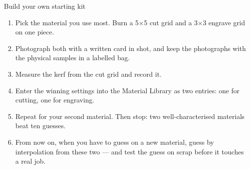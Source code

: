 \begin{tryit}{Build your own starting kit}
\begin{enumerate}[label=\arabic*.,leftmargin=1.4em]
  \item Pick the material you use most. Burn a 5$\times$5 cut grid and a
        3$\times$3 engrave grid on one piece.
  \item Photograph both with a written card in shot, and keep the photographs
        with the physical samples in a labelled bag.
  \item Measure the kerf from the cut grid and record it.
  \item Enter the winning settings into the Material Library as two entries: one
        for cutting, one for engraving.
  \item Repeat for your second material. Then stop: two well-characterised
        materials beat ten guesses.
  \item From now on, when you have to guess on a new material, guess by
        interpolation from these two --- and test the guess on scrap before it
        touches a real job.
\end{enumerate}
\end{tryit}
